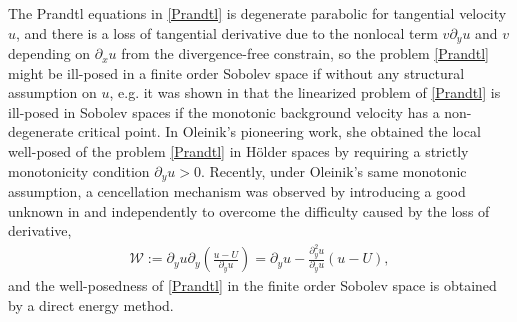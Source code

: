 \documentclass{amsart}
\numberwithin{equation}{section}
\begin{document}
The Prandtl equations in \eqref{Prandtl} is degenerate parabolic for tangential velocity $u$, and there is a loss of tangential derivative due to the nonlocal term $v\partial_{y}u$ and $v$ depending on $\partial_{x}u$ from the divergence-free constrain, so the problem \eqref{Prandtl} might be ill-posed  in a finite order Sobolev space if without any structural assumption on $u$, e.g. it was shown in \cite{GD} that the linearized problem of \eqref{Prandtl} is ill-posed in Sobolev spaces if the monotonic background velocity has a non-degenerate critical point. In Oleinik's pioneering work, she obtained the local well-posed of the problem \eqref{Prandtl} in H\"{o}lder spaces by requiring a strictly monotonicity condition $\partial_{y}u>0$. Recently, under Oleinik's same monotonic assumption, a cencellation mechanism was observed by introducing a good unknown in \cite{AWXY} and \cite{MW} independently to overcome the difficulty caused by the loss of derivative,
\begin{align}\label{Good}
\mathcal{W}:=\partial_{y}u\partial_{y}\left(\frac{u-U}{\partial_{y}u}\right)=\partial_{y}u-\frac{\partial_{y}^{2}u}{\partial_{y}u}(u-U),
\end{align}
and the well-posedness of \eqref{Prandtl} in the finite order Sobolev space is obtained by a direct energy method.
\end{document}
